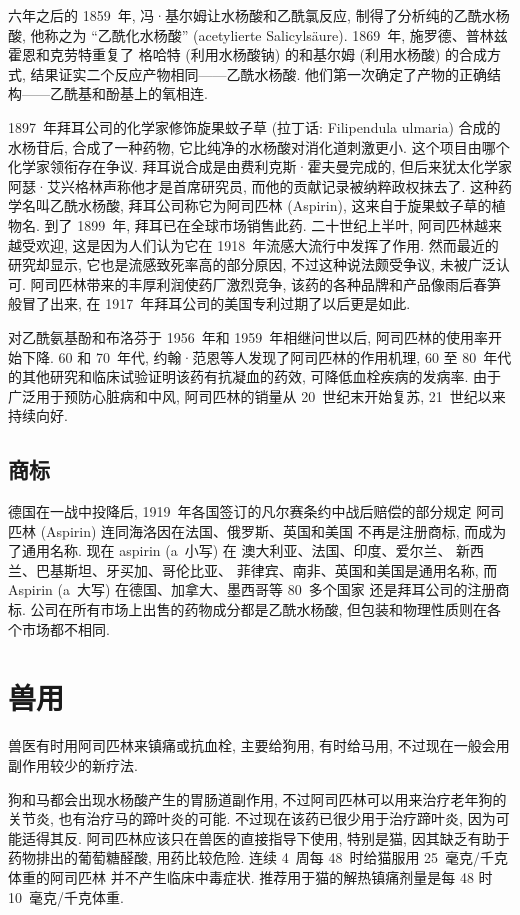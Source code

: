 六年之后的 1859~年, 冯·基尔姆让水杨酸和乙酰氯反应,
制得了分析纯的乙酰水杨酸, 他称之为
``乙酰化水杨酸''
(acetylierte Salicyls\"aure).
1869~年, 施罗德、普林兹霍恩和克劳特重复了%
格哈特 (利用水杨酸钠) 的和基尔姆 (利用水杨酸) 的合成方式,
结果证实二个反应产物相同——乙酰水杨酸.
他们第一次确定了产物的正确结构——乙酰基和酚基上的氧相连.

1897~年拜耳公司的化学家修饰旋果蚊子草
(拉丁话: Filipendula ulmaria)
合成的水杨苷后, 合成了一种药物,
它比纯净的水杨酸对消化道刺激更小.
这个项目由哪个化学家领衔存在争议.
拜耳说合成是由费利克斯·霍夫曼完成的,
但后来犹太化学家阿瑟·艾兴格林声称他才是首席研究员,
而他的贡献记录被纳粹政权抹去了.
这种药学名叫乙酰水杨酸,
拜耳公司称它为阿司匹林 (Aspirin),
这来自于旋果蚊子草的植物名.
到了 1899~年, 拜耳已在全球市场销售此药.
二十世纪上半叶, 阿司匹林越来越受欢迎,
这是因为人们认为它在 1918~年流感大流行中发挥了作用.
然而最近的研究却显示, 它也是流感致死率高的部分原因,
不过这种说法颇受争议, 未被广泛认可.
阿司匹林带来的丰厚利润使药厂激烈竞争,
该药的各种品牌和产品像雨后春笋般冒了出来,
在 1917~年拜耳公司的美国专利过期了以后更是如此.

对乙酰氨基酚和布洛芬于 1956~年和 1959~年相继问世以后,
阿司匹林的使用率开始下降.
60 和 70~年代, 约翰·范恩等人发现了阿司匹林的作用机理,
60 至 80~年代的其他研究和临床试验证明该药有抗凝血的药效,
可降低血栓疾病的发病率.
由于广泛用于预防心脏病和中风,
阿司匹林的销量从 20~世纪末开始复苏,
21~世纪以来持续向好.

\subsection{商标}

德国在一战中投降后,
1919~年各国签订的凡尔赛条约中战后赔偿的部分规定%
阿司匹林 (Aspirin) 连同海洛因在法国、俄罗斯、英国和美国%
不再是注册商标, 而成为了通用名称.
现在 aspirin (a~小写) 在%
澳大利亚、法国、印度、爱尔兰、%
新西兰、巴基斯坦、牙买加、哥伦比亚、%
菲律宾、南非、英国和美国是通用名称,
而 Aspirin (a~大写) 在德国、加拿大、墨西哥等 80~多个国家%
还是拜耳公司的注册商标.
公司在所有市场上出售的药物成分都是乙酰水杨酸,
但包装和物理性质则在各个市场都不相同.

\section{兽用}

兽医有时用阿司匹林来镇痛或抗血栓,
主要给狗用, 有时给马用,
不过现在一般会用副作用较少的新疗法.

狗和马都会出现水杨酸产生的胃肠道副作用,
不过阿司匹林可以用来治疗老年狗的关节炎,
也有治疗马的蹄叶炎的可能.
不过现在该药已很少用于治疗蹄叶炎,
因为可能适得其反.
阿司匹林应该只在兽医的直接指导下使用,
特别是猫, 因其缺乏有助于药物排出的葡萄糖醛酸,
用药比较危险.
连续 4~周每 48~时给猫服用 25~毫克/千克体重的阿司匹林%
并不产生临床中毒症状.
推荐用于猫的解热镇痛剂量是每 48 时 10~毫克/千克体重.
